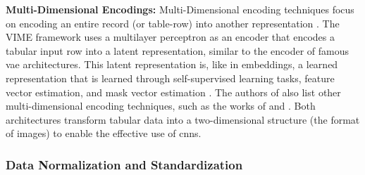 
\textbf{Multi-Dimensional Encodings:}
Multi-Dimensional encoding techniques focus on encoding an entire record (or table-row) into another representation \cite{borisov2022DeepNeuralNetworks}.
The VIME framework \cite{yoon2020VIMEExtendingSuccess} uses a multilayer perceptron as an encoder that encodes a tabular input row into a latent representation, 
similar to the encoder of famous \gls{vae} \cite{kingma2013AutoEncodingVariationalBayes} architectures.
This latent representation is, like in embeddings, a learned representation that is learned through self-supervised learning tasks, feature vector estimation, and mask vector estimation \cite{yoon2020VIMEExtendingSuccess}.
The authors of \cite{borisov2022DeepNeuralNetworks} also list other multi-dimensional encoding techniques, such as the works of \cite{zhu2021ConvertingTabularData} and \cite{sun2019supertml}.
Both architectures transform tabular data into a two-dimensional structure (\eg the format of images) to enable the effective use of \glspl{cnn}.


\subsubsection{Data Normalization and Standardization}
\label{sec:dataNormalization} 

